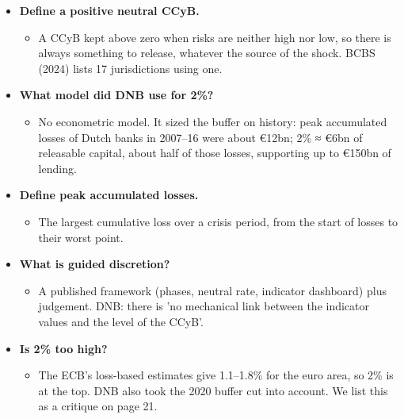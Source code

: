 \documentclass[10pt]{article}
\begin{document}
\begin{tcolorbox}[sbox,width=0.495\linewidth,height=14.6cm,nobeforeafter,box align=top,fit basedim=11pt,colframe=nlred!70,colbacktitle=nlred!8,coltitle=nlred,title=LIKELY CHALLENGES · definitions and logic]
\begin{itemize}
\item[\textcolor{navy}{\textbf{Q}}] \textbf{Define a positive neutral CCyB.}
\begin{itemize}
\item A CCyB kept above zero when risks are neither high nor low, so there is always something to release, whatever the source of the shock. BCBS (2024) lists 17 jurisdictions using one.
\end{itemize}
\item[\textcolor{navy}{\textbf{Q}}] \textbf{What model did DNB use for 2\%?}
\begin{itemize}
\item No econometric model. It sized the buffer on history: peak accumulated losses of Dutch banks in 2007–16 were about €12bn; 2\% ≈ €6bn of releasable capital, about half of those losses, supporting up to €150bn of lending.
\end{itemize}
\item[\textcolor{navy}{\textbf{Q}}] \textbf{Define peak accumulated losses.}
\begin{itemize}
\item The largest cumulative loss over a crisis period, from the start of losses to their worst point.
\end{itemize}
\item[\textcolor{navy}{\textbf{Q}}] \textbf{What is guided discretion?}
\begin{itemize}
\item A published framework (phases, neutral rate, indicator dashboard) plus judgement. DNB: there is 'no mechanical link between the indicator values and the level of the CCyB'.
\end{itemize}
\item[\textcolor{navy}{\textbf{Q}}] \textbf{Is 2\% too high?}
\begin{itemize}
\item The ECB's loss-based estimates give 1.1–1.8\% for the euro area, so 2\% is at the top. DNB also took the 2020 buffer cut into account. We list this as a critique on page 21.
\end{itemize}
\end{itemize}
\end{tcolorbox}
\newpage
\end{document}
